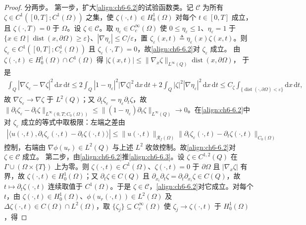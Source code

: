 \documentclass[../../main.tex]{subfiles}%
\begin{document}
\begin{proof}
分两步。
第一步，扩大\eqref{align:ch6-6.2}的试验函数类。记 $\mathscr{C}$ 为所有 $\zeta\in C^1([0,T];C^1(\Omega))$ 之集，使 $\zeta(\cdot,t)\in H^1_0(\Omega)$ 对每个 $t\in[0,T]$ 成立，且 $\zeta(\cdot,T)=0$ 于 $\Omega$。设 $\zeta\in\mathscr{C}$。取 $\eta_\varepsilon\in C^\infty_c(\Omega)$ 使 $0\leqslant\eta_\varepsilon\leqslant1$、$\eta_\varepsilon=1$ 于 $\{x\in\Omega\mid\operatorname{dist}(x,\partial\Omega)\geqslant\varepsilon\}$、$|\nabla\eta_\varepsilon|\leqslant C/\varepsilon$，置 $\zeta_\varepsilon(x,t)\triangleq\eta_\varepsilon(x)\zeta(x,t)$。则 $\zeta_\varepsilon\in C^1([0,T];C^1_c(\Omega))$ 且 $\zeta_\varepsilon(\cdot,T)=0$，故\eqref{align:ch6-6.2}对 $\zeta_\varepsilon$ 成立。
由 $\zeta(\cdot,t)\in H^1_0(\Omega)\cap C^1(\Omega)$ 得 $|\zeta(x,t)|\leqslant\|\nabla_x\zeta\|_{L^\infty(Q)}\operatorname{dist}(x,\partial
\Omega)$，
于是
\begin{align*}
\int_Q|\nabla\zeta_\varepsilon-\nabla\zeta|^2\,\mathrm{d}x\,\mathrm{d}t
\leqslant 2\int_Q|1-\eta_\varepsilon|^2|\nabla\zeta|^2\,\mathrm{d}x\,\mathrm{d}t
+2\int_Q|\zeta|^2|\nabla\eta_\varepsilon|^2\,\mathrm{d}x\,\mathrm{d}t
\leqslant C_\zeta\int_{\{\operatorname{dist}(\cdot,\partial\Omega)<\varepsilon\}}\mathrm{d}x\,\mathrm{d}t,
\end{align*}
故 $\nabla\zeta_\varepsilon\to\nabla\zeta$ 于 $L^2(Q)$；又 $\partial_t\zeta_\varepsilon=\eta_\varepsilon\partial_t\zeta$，故 $\|\partial_t\zeta_\varepsilon-\partial_t\zeta\|_{L^\infty(0,T;C_0(\Omega))}\leqslant\|(1-\eta_\varepsilon)\partial_t\zeta\|_{L^\infty(Q)}\to0$。在\eqref{align:ch6-6.2}中对 $\zeta_\varepsilon$ 成立的等式中取极限：左端之差由
\begin{align*}
\left|\langle u(\cdot,t),\partial_t\zeta_\varepsilon(\cdot,t)-\partial_t\zeta(\cdot,t)\rangle\right|
\leqslant\|u(\cdot,t)\|_{\mathscr{R}_f(\Omega)}\|\partial_t\zeta_\varepsilon(\cdot,t)-\partial_t\zeta(\cdot,t)\|_{C_0(\Omega)}
\end{align*}
控制，右端由 $\nabla\phi(u_r)\in L^2(Q)$ 与上述 $L^2$ 收敛控制。故\eqref{align:ch6-6.2}对 $\zeta\in\mathscr{C}$ 成立。
第二步，由\eqref{align:ch6-6.2}推\eqref{align:ch6-6.3}。设 $\zeta\in C^{1,2}(Q)$ 在 $\Gamma\cup(\Omega\times\{T\})$ 上为零。则 $\zeta(\cdot,t)\in C^1(\Omega)$、$\zeta(\cdot,t)=0$ 于 $\partial\Omega$ 且 $|\nabla_x\zeta|$ 有界，故 $\zeta(\cdot,t)\in H^1_0(\Omega)$；又 $\partial_t\zeta\in C(Q)$ 且 $\partial_{x_i}\partial_t\zeta=\partial_t\partial_{x_i}\zeta\in C(Q)$，故 $t\mapsto\partial_t\zeta(\cdot,t)$ 连续取值于 $C^1(\Omega)$。于是 $\zeta\in\mathscr{C}$，\eqref{align:ch6-6.2}对它成立。对每个 $t$，由 $\zeta(\cdot,t)\in H^1_0(\Omega)$、$\phi(u_r(\cdot,t))\in L^2(\Omega)$ 及 $\Delta\zeta(\cdot,t)\in C(\Omega)\cap L^2(\Omega)$，取 $\{\zeta_j\}\subseteq C^\infty_c(\Omega)$ 使 $\zeta_j\to\zeta(\cdot,t)$ 于 $H^1_0(\Omega)$，得

\end{proof}
\end{document}
